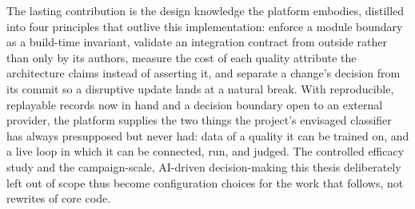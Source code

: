 The lasting contribution is the design knowledge the platform embodies, distilled into four principles that outlive this implementation: enforce a module boundary as a build-time invariant, validate an integration contract from outside rather than only by its authors, measure the cost of each quality attribute the architecture claims instead of asserting it, and separate a change's decision from its commit so a disruptive update lands at a natural break.
With reproducible, replayable records now in hand and a decision boundary open to an external provider, the platform supplies the two things the project's envisaged classifier has always presupposed but never had: data of a quality it can be trained on, and a live loop in which it can be connected, run, and judged.
The controlled efficacy study and the campaign-scale, AI-driven decision-making this thesis deliberately left out of scope thus become configuration choices for the work that follows, not rewrites of core code.
